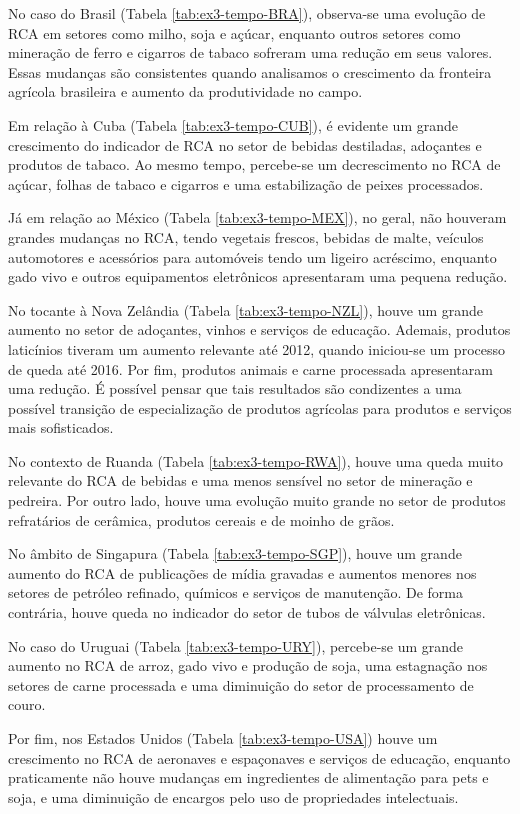 No caso do Brasil (Tabela \ref{tab:ex3-tempo-BRA}), observa-se uma evolução de RCA em setores como milho, soja e açúcar, enquanto outros setores como mineração de ferro e cigarros de tabaco sofreram uma redução em seus valores. Essas mudanças são consistentes quando analisamos o crescimento da fronteira agrícola brasileira e aumento da produtividade no campo.

Em relação à Cuba (Tabela \ref{tab:ex3-tempo-CUB}), é evidente um grande crescimento do indicador de RCA no setor de bebidas destiladas, adoçantes e produtos de tabaco. Ao mesmo tempo, percebe-se um decrescimento no RCA de açúcar, folhas de tabaco e cigarros e uma estabilização de peixes processados. 

Já em relação ao México (Tabela \ref{tab:ex3-tempo-MEX}), no geral, não houveram grandes mudanças no RCA, tendo vegetais frescos, bebidas de malte, veículos automotores e acessórios para automóveis tendo um ligeiro acréscimo, enquanto gado vivo e outros equipamentos eletrônicos apresentaram uma pequena redução.

No tocante à Nova Zelândia (Tabela \ref{tab:ex3-tempo-NZL}), houve um grande aumento no setor de adoçantes, vinhos e serviços de educação. Ademais, produtos laticínios tiveram um aumento relevante até 2012, quando iniciou-se um processo de queda até 2016. Por fim, produtos animais e carne processada apresentaram uma redução. É possível pensar que tais resultados são condizentes a uma possível transição de especialização de produtos agrícolas para produtos e serviços mais sofisticados.

No contexto de Ruanda (Tabela \ref{tab:ex3-tempo-RWA}), houve uma queda muito relevante do RCA de bebidas e uma menos sensível no setor de mineração e pedreira. Por outro lado, houve uma evolução muito grande no setor de produtos refratários de cerâmica, produtos cereais e de moinho de grãos.

No âmbito de Singapura (Tabela \ref{tab:ex3-tempo-SGP}), houve um grande aumento do RCA de publicações de mídia gravadas e aumentos menores nos setores de petróleo refinado, químicos e serviços de manutenção. De forma contrária, houve queda no indicador do setor de tubos de válvulas eletrônicas.

No caso do Uruguai (Tabela \ref{tab:ex3-tempo-URY}), percebe-se um grande aumento no RCA de arroz, gado vivo e produção de soja, uma estagnação nos setores de carne processada e uma diminuição do setor de processamento de couro. 

Por fim, nos Estados Unidos (Tabela \ref{tab:ex3-tempo-USA}) houve um crescimento no RCA de aeronaves e espaçonaves e serviços de educação, enquanto praticamente não houve mudanças em ingredientes de alimentação para pets e soja, e uma diminuição de encargos pelo uso de propriedades intelectuais. 

